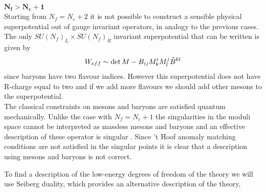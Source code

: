 \\
$\mathbf{ N_f > N_c +1 }$\\
Starting from $N_f = N_c +2$ it is not possible to construct a sensible physical superpotential out of gauge invariant operators, in analogy to the previous cases.
The only $SU(N_f)_L \times SU(N_f)_R$ invariant superpotential that can be written is given by
\begin{equation}
 W_{eff} \sim \mathrm{det } \,{M} - B_{ij} M^i_k M^j_l \tilde{B}^{kl} 
 \end{equation} 
since baryons have two flavour indices.
However this superpotential does not have R-charge equal to two and if we add more flavours we should add other mesons to the superpotential.\\
The classical constraints on mesons and baryons are satisfied quantum mechanically.
Unlike the case with $N_f = N_c +1$ the singularities in the moduli space cannot be interpreted as massless mesons and baryons and an effective description of these operator is singular \cite{Seiberg:1994bz}.
Since 't Hoof anomaly matching conditions are not satisfied in the singular points it is clear that a description using mesons and baryons is not correct.

To find a description of the low-energy degrees of freedom of the theory we will use Seiberg duality, which provides an alternative description of the theory,






\newpage

%